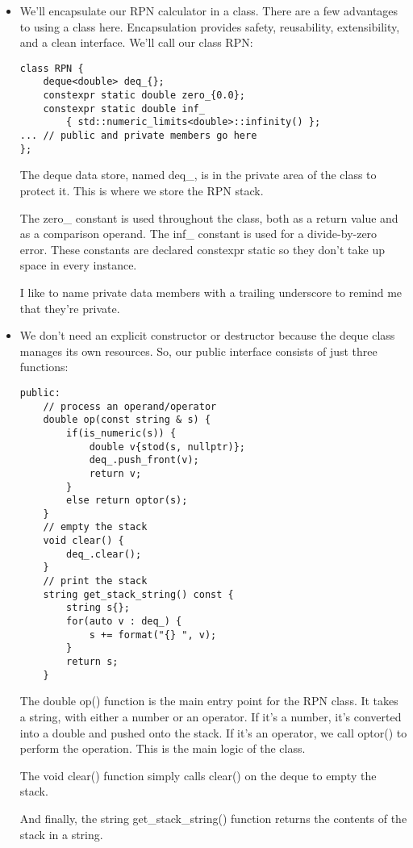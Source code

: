 \begin{itemize}
\item 
We'll encapsulate our RPN calculator in a class. There are a few advantages to using a class here. Encapsulation provides safety, reusability, extensibility, and a clean interface. We'll call our class RPN:

\begin{lstlisting}[style=styleCXX]
class RPN {
	deque<double> deq_{};
	constexpr static double zero_{0.0};
	constexpr static double inf_
		{ std::numeric_limits<double>::infinity() };
... // public and private members go here
};
\end{lstlisting}

The deque data store, named deq\_, is in the private area of the class to protect it.
This is where we store the RPN stack.

The zero\_ constant is used throughout the class, both as a return value and as a comparison operand. The inf\_ constant is used for a divide-by-zero error. These constants are declared constexpr static so they don't take up space in every instance.

I like to name private data members with a trailing underscore to remind me that they're private.

\item 
We don't need an explicit constructor or destructor because the deque class manages its own resources. So, our public interface consists of just three functions:

\begin{lstlisting}[style=styleCXX]
public:
	// process an operand/operator
	double op(const string & s) {
		if(is_numeric(s)) {
			double v{stod(s, nullptr)};
			deq_.push_front(v);
			return v;
		}
		else return optor(s);
	}
	// empty the stack
	void clear() {
		deq_.clear();
	}
	// print the stack
	string get_stack_string() const {
		string s{};
		for(auto v : deq_) {
			s += format("{} ", v);
		}
		return s;
	}
\end{lstlisting}

The double op() function is the main entry point for the RPN class. It takes a string, with either a number or an operator. If it's a number, it's converted into a double and pushed onto the stack. If it's an operator, we call optor() to perform the operation. This is the main logic of the class.

The void clear() function simply calls clear() on the deque to empty the stack.

And finally, the string get\_stack\_string() function returns the contents of the stack in a string.


\end{itemize}
